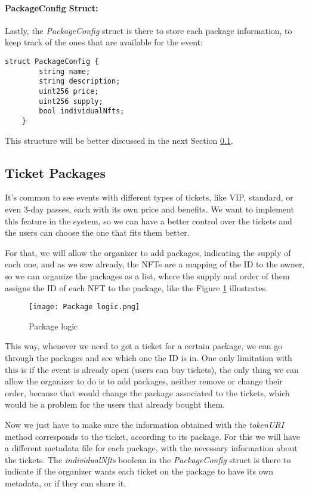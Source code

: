 \paragraph{PackageConfig Struct:} Lastly, the \textit{PackageConfig} struct is there to store each package
information, to keep track of the ones that are available for the event:
\begin{lstlisting}[caption=PackageConfig struct]
    struct PackageConfig {
        string name;
        string description;
        uint256 price;
        uint256 supply;
        bool individualNfts;
    }
\end{lstlisting}
This structure will be better discussed in the next Section
\ref{subsec:ticket_packages}.

\subsection{Ticket Packages}
\label{subsec:ticket_packages}

It's common to see events with different types of tickets, like VIP, standard,
or even 3-day passes, each with its own price and benefits. We want to
implement this feature in the system, so we can have a better control over the
tickets and the users can choose the one that fits them better.

For that, we will allow the organizer to add packages, indicating the supply of
each one, and as we saw already, the NFTs are a mapping of the ID to the owner,
so we can organize the packages as a list, where the supply and order of them
assigns the ID of each NFT to the package, like the Figure
\ref{fig:package_logic} illustrates.

\begin{figure}[H]
	\texttt{[image: Package logic.png]}
	\centering
	\caption{Package logic}
	\label{fig:package_logic}
\end{figure}

This way, whenever we need to get a ticket for a certain package, we can go
through the packages and see which one the ID is in. One only limitation with
this is if the event is already open (users can buy tickets), the only thing we
can allow the organizer to do is to add packages, neither remove or change
their order, because that would change the package associated to the tickets,
which would be a problem for the users that already bought them.

Now we just have to make sure the information obtained with the
\textit{tokenURI} method corresponds to the ticket, according to its package.
For this we will have a different metadata file for each package, with the
necessary information about the tickets. The \textit{individualNfts} boolean in
the \textit{PackageConfig} struct is there to indicate if the organizer wants
each ticket on the package to have its own metadata, or if they can share it.

